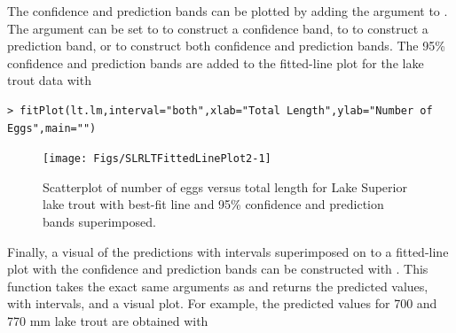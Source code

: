 \documentclass[10pt,openany]{book}\usepackage[]{graphicx}\usepackage[]{color}
\makeatletter
\newenvironment{kframe}{%
 \def\at@end@of@kframe{}%
 \ifinner\ifhmode%
  \def\at@end@of@kframe{\end{minipage}}%
  \begin{minipage}{\columnwidth}%
 \fi\fi%
 \def\FrameCommand##1{\hskip\@totalleftmargin \hskip-\fboxsep
 \colorbox{shadecolor}{##1}\hskip-\fboxsep
     \hskip-\linewidth \hskip-\@totalleftmargin \hskip\columnwidth}%
 \MakeFramed {\advance\hsize-\width
   \@totalleftmargin\z@ \linewidth\hsize
   \@setminipage}}%
 {\par\unskip\endMakeFramed%
 \at@end@of@kframe}
\newenvironment{knitrout}{}{} %
\makeatother
\begin{document}
The confidence and prediction bands can be plotted by adding the  argument to .  The  argument can be set to  to construct a confidence band, to  to construct a prediction band, or  to construct both confidence and prediction bands.  The 95\% confidence and prediction bands are added to the fitted-line plot for the lake trout data  with

\begin{knitrout}
\color{fgcolor}\begin{kframe}
\begin{verbatim}
> fitPlot(lt.lm,interval="both",xlab="Total Length",ylab="Number of Eggs",main="")
\end{verbatim}
\end{kframe}\begin{figure}[h]

{\centering \texttt{[image: Figs/SLRLTFittedLinePlot2-1]} 

}

\caption[Scatterplot of number of eggs versus total length for Lake Superior lake trout with best-fit line and 95\% confidence and prediction bands superimposed]{Scatterplot of number of eggs versus total length for Lake Superior lake trout with best-fit line and 95\% confidence and prediction bands superimposed.}\label{fig:SLRLTFittedLinePlot2}
\end{figure}


\end{knitrout}

Finally, a visual of the predictions with intervals superimposed on to a fitted-line plot with the confidence and prediction bands can be constructed with .  This function takes the exact same arguments as  and returns the predicted values, with intervals, and a visual plot.  For example, the predicted values for 700 and 770 mm lake trout are obtained with
\end{document}
